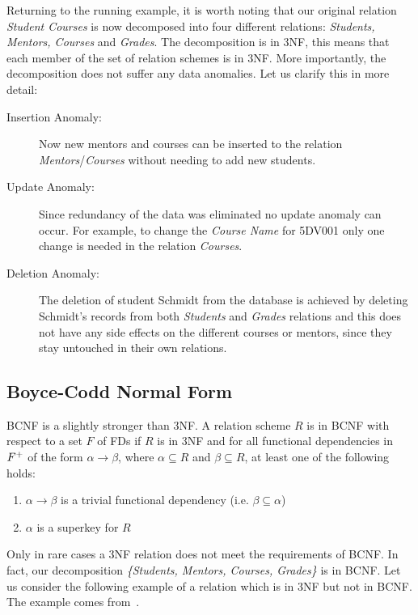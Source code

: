 Returning to the running example, it is worth noting that our original relation \textit{Student Courses} is now decomposed
into four different relations: \textit{Students, Mentors, Courses} and \textit{Grades}. The 
decomposition is in 3NF, this means that each member of the set of relation schemes is in 3NF. 
More importantly, the decomposition does not suffer any data anomalies. 
Let us clarify this in more detail:
\begin{description}
  \item[Insertion Anomaly:] Now new mentors and courses can be inserted to the relation \textit{Mentors}/\textit{Courses} without needing to add new students.
  \item[Update Anomaly:] Since redundancy of the data was eliminated no update anomaly can occur. For example, to change the \textit{Course Name} for 5DV001 only one change is needed in the relation \textit{Courses}.
  \item[Deletion Anomaly:]  The deletion of student Schmidt from the database is achieved by deleting Schmidt's records from both \textit{Students} and \textit{Grades} relations and this does not have any side effects on the different courses or mentors, since they stay untouched in their own relations.  
\end{description}

\subsection{Boyce-Codd Normal Form}
\label{sec:BCNF}
BCNF is a slightly stronger than 3NF. A relation scheme $R$ is in BCNF 
with respect to a set $F$ of FDs if $R$ is in 3NF and for all functional dependencies in $F\sp{+}$ 
of the form $\alpha \rightarrow \beta$, where $\alpha \subseteq R$ and $\beta \subseteq R$,
at least one of the following holds:
\begin{enumerate}
  \item $\alpha \rightarrow \beta$ is a trivial functional dependency (i.e. $\beta \subseteq \alpha$)
  \item $\alpha$ is a superkey for $R$ 
\end{enumerate}

Only in rare cases a 3NF relation does not meet the requirements of BCNF. In fact, our decomposition 
\textit{\{Students, Mentors, Courses, Grades\}} is in BCNF. Let us consider the following
example of a relation which is in 3NF but not in BCNF.  The example 
comes from~\cite[Section 6.5.3]{bdb2}.

